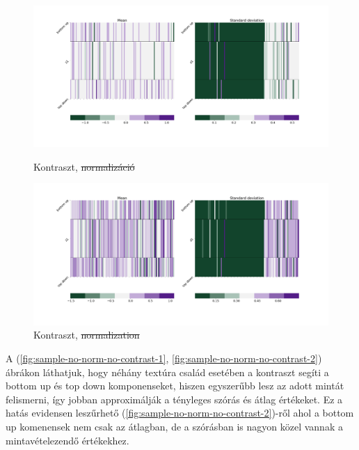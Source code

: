 \documentclass[12pt, english]{article}
\begin{document}
\begin{figure}[H]
  \begin{minipage}{0.5\linewidth}
    \centering
    \includegraphics[width=.75\linewidth]{z1_vis/z1_vis_contrast_no_norm/15_DenseLinLinLadderVAE_textures_noContrastNorm_contrast-stats-1_vector_comparisons_1.png} 
    \caption{Kontraszt, \st{normalizáció}}
    \label{fig:sample-no-norm-contrast-1}
  \end{minipage}
  \begin{minipage}{0.5\linewidth}
    \centering
    \includegraphics[width=.75\linewidth]{z1_vis/z1_vis_contrast_no_norm/15_DenseLinLinLadderVAE_textures_noContrastNorm_contrast-stats-2_vector_comparisons_1.png}
    \caption{Kontraszt, \st{normalization}}
    \label{fig:sample-no-norm-contrast-2}
  \end{minipage}
\end{figure}

\vspace{4mm}

\par A (\ref{fig:sample-no-norm-no-contrast-1}, \ref{fig:sample-no-norm-no-contrast-2}) ábrákon láthatjuk, hogy néhány textúra család esetében a kontraszt segíti a bottom up és top down komponenseket, hiszen egyszerűbb lesz az adott mintát felismerni, így jobban approximálják a tényleges szórás és átlag értékeket. Ez a hatás evidensen leszűrhető (\ref{fig:sample-no-norm-no-contrast-2})-ről ahol a bottom up komenensek nem csak az átlagban, de a szórásban is nagyon közel vannak a mintavételezendő értékekhez.

\vspace{4mm}
\end{document}
